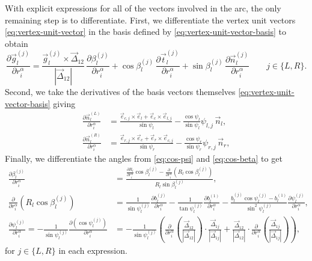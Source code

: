 \documentclass[11pt,twoside]{report}
\begin{document}
With explicit expressions for all of the vectors involved in the arc, the only remaining step is to differentiate.
First, we differentiate the vertex unit vectors \eqref{eq:vertex-unit-vector} in the basis defined by \eqref{eq:vertex-unit-vector-basis} to obtain
\begin{equation}
  \frac{\partial \vec{g}_l^{(j)}}{\partial r_i^\alpha} =
  \frac{\vec{g}_l^{(j)} \times \vec{\Delta}_{12}}{|\vec{\Delta}_{12}|} \,
  \frac{\partial \beta_l^{(j)}}{\partial r_i^\alpha} +
  \cos{\beta_l^{(j)}} \,
  \frac{\partial \vec{t}_l^{(j)}}{\partial r_i^\alpha} +
  \sin{\beta_l^{(j)}} \,
  \frac{\partial \vec{n}_l^{(j)}}{\partial r_i^\alpha}
  \qquad j \in \{L,R\}.
\end{equation}
Second, we take the derivatives of the basis vectors themselves \eqref{eq:vertex-unit-vector-basis} giving
\begin{subequations}
\begin{align}
  \frac{\partial \vec{n}_l^{(L)}}{\partial r_i^\alpha} &=
  \frac{\vec{e}_{c,j} \times \vec{e}_l + \vec{e}_c \times \vec{e}_{l,j}}{\sin{\psi_l}}
  - \frac{\cos{\psi_l}}{\sin{\psi_l}} \psi_{l,j} \, \vec{n}_l, \\
  \frac{\partial \vec{n}_l^{(R)}}{\partial r_i^\alpha} &=
  \frac{\vec{e}_{r,j} \times \vec{e}_c + \vec{e}_r \times \vec{e}_{c,j}}{\sin{\psi_r}}
  - \frac{\cos{\psi_r}}{\sin{\psi_r}} \psi_{r,j} \, \vec{n}_r,
\end{align}
\end{subequations}
Finally, we differentiate the angles from \eqref{eq:cos-psi} and \eqref{eq:cos-beta} to get
\begin{subequations}
\begin{align}
 \frac{\partial \beta_l^{(j)}}{\partial r_i^\alpha} &=
  \frac{
  \frac{\partial R_l}{\partial r_i^\alpha}
  \cos{\beta_l^{(j)}} -
  \frac{\partial}{\partial r_i^\alpha}
  \left( R_l \cos{\beta_l^{(j)}} \right)}
  {R_l \sin{\beta_l^{(j)}}}, \\
 \frac{\partial}{\partial r_i^\alpha}
  \left( R_l \cos{\beta_l^{(j)}} \right) &=
  \frac{1}{\sin{\psi_l^{(j)}}}
  \frac{\partial b_l^{(j)}}{\partial r_i^\alpha}
  - \frac{1}{\tan{\psi_l^{(j)}}}
  \frac{\partial b_l^{(1)}}{\partial r_i^\alpha}
  - \frac{b_l^{(j)} \cos{\psi_l^{(j)}} - b_l^{(1)}}
  {\sin^2{\psi_l^{(j)}}}
  \frac{\partial \psi_l^{(j)}}{\partial r_i^\alpha}, \\
  \frac{\partial \psi_l^{(j)}}{\partial r_i^\alpha} =
  -\frac{1}{\sin\psi_l^{(j)}} \frac{\partial(\cos{\psi_l^{(j)}})}{\partial r_i^\alpha} &=
  -\frac{1}{\sin\psi_l^{(j)}}
  \left(
  \frac{\partial}{\partial r_i^\alpha}
  \left( \frac{\vec{\Delta}_{12}}{|\vec{\Delta}_{12}|} \right) \cdot
  \frac{\vec{\Delta}_{1j}}{|\vec{\Delta}_{1j}|}
  +
  \frac{\vec{\Delta}_{12}}{|\vec{\Delta}_{12}|} \cdot
  \frac{\partial}{\partial r_i^\alpha}
  \left( \frac{\vec{\Delta}_{1j}}{|\vec{\Delta}_{1j}|} \right)
  \right),
\end{align}
\end{subequations}
for $j \in \{L,R\}$ in each expression.
\end{document}
